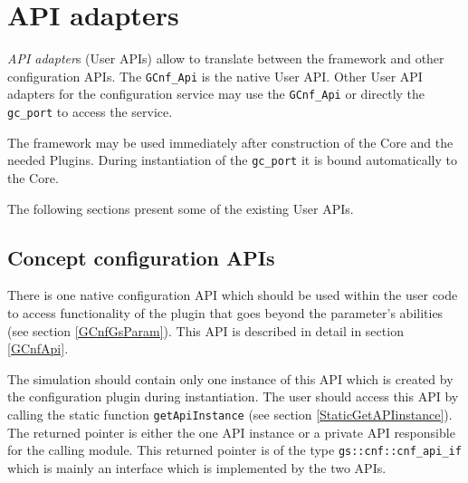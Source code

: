 \section{API adapters}
{\em API adapter}s (User APIs) allow to translate between the \GreenConfig framework and other configuration APIs. The \lstinline|GCnf_Api| is the native User API. Other User API adapters for the configuration service may use the \lstinline|GCnf_Api| or directly the \lstinline|gc_port| to access the service.

The framework may be used immediately after construction of the Core and the needed Plugins. During instantiation of the \lstinline|gc_port| it is bound automatically to the Core.


The following sections present some of the existing User APIs.

\subsection{Concept configuration APIs}
\label{GCnfConceptConfigurationApi}
There is one native configuration \GreenConfig API which should be used within the user code to access functionality of the plugin that goes beyond the parameter's abilities (see section \ref{GCnfGsParam}). This API is described in detail in section \ref{GCnfApi}.

The simulation should contain only one instance of this API which is created by the configuration plugin during instantiation. The user should access this API by calling the static function  \lstinline|getApiInstance| (see section \ref{StaticGetAPIinstance}). The returned pointer is either the one API instance or a private API responsible for the calling module. This returned pointer is of the type \lstinline|gs::cnf::cnf_api_if| which is mainly an interface which is implemented by the two APIs.



